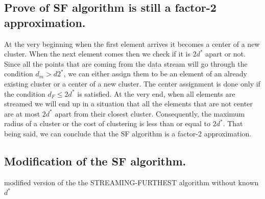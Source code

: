 \documentclass[11pt,a4paper,english]{article}
\begin{document}
      \subsection{Prove of SF algorithm is still a factor-2 approximation.}
        At the very beginning when the first element arrives it becomes a center of a new cluster. When the next element comes then we check if it is $2d^*$ apart or not. Since all the points that are coming from the data stream will go through the condition $d_m > d2^*$, we can either assign them to be an element of an already existing cluster or a center of a new cluster. The center assignment is done only if the condition $d_F \leq 2d^*$ is satisfied. At the very end, when all elements are streamed we will end up in a situation that all the elements that are not center are at most $2d^*$ apart from their closest cluster. Consequently, the maximum radius of a cluster or the cost of clustering is less than or equal to $2d^*$. That being said, we can conclude that the SF algorithm is a factor-2 approximation.
      \subsection{Modification of the SF algorithm.}

        \begin{algorithm}
          \caption{modified version of the the STREAMING-FURTHEST algorithm without known $d^*$}

        \end{algorithm}
\end{document}
